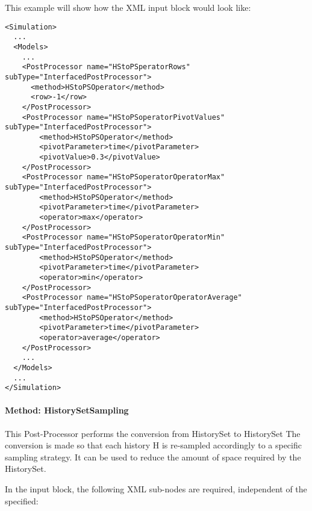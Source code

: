 This example will show how the XML input block would look like:

\begin{lstlisting}[style=XML,morekeywords={subType,debug,name,class,type}]
<Simulation>
  ...
  <Models>
    ...
    <PostProcessor name="HStoPSperatorRows" subType="InterfacedPostProcessor">
      <method>HStoPSOperator</method>
      <row>-1</row>
    </PostProcessor>
    <PostProcessor name="HStoPSoperatorPivotValues" subType="InterfacedPostProcessor">
        <method>HStoPSOperator</method>
        <pivotParameter>time</pivotParameter>
        <pivotValue>0.3</pivotValue>
    </PostProcessor>
    <PostProcessor name="HStoPSoperatorOperatorMax" subType="InterfacedPostProcessor">
        <method>HStoPSOperator</method>
        <pivotParameter>time</pivotParameter>
        <operator>max</operator>
    </PostProcessor>
    <PostProcessor name="HStoPSoperatorOperatorMin" subType="InterfacedPostProcessor">
        <method>HStoPSOperator</method>
        <pivotParameter>time</pivotParameter>
        <operator>min</operator>
    </PostProcessor>
    <PostProcessor name="HStoPSoperatorOperatorAverage" subType="InterfacedPostProcessor">
        <method>HStoPSOperator</method>
        <pivotParameter>time</pivotParameter>
        <operator>average</operator>
    </PostProcessor>
    ...
  </Models>
  ...
</Simulation>
\end{lstlisting}

\paragraph{Method: HistorySetSampling}
This Post-Processor performs the conversion from HistorySet to HistorySet
The conversion is made so that each history H is re-sampled accordingly  to a
specific sampling strategy.
It can be used to reduce the amount of space required by the HistorySet.

In the  input block, the following XML sub-nodes are required,
independent of the  specified:


